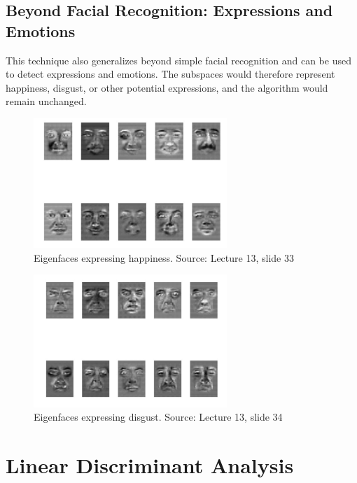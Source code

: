 \documentclass{article}
\begin{document}
\subsection{Beyond Facial Recognition: Expressions and Emotions}
This technique also generalizes beyond simple facial recognition and can be used to detect expressions and emotions. The subspaces would therefore represent happiness, disgust, or other potential expressions, and the algorithm would remain unchanged. 

\begin{figure}[H]
  \centering
  \includegraphics[width=0.65\textwidth]{happy}
  \caption{Eigenfaces expressing happiness. Source: Lecture 13, slide 33}
\end{figure}

\begin{figure}[H]
  \centering
  \includegraphics[width=0.65\textwidth]{disgust}
  \caption{Eigenfaces expressing disgust. Source: Lecture 13, slide 34}
\end{figure}


\section{Linear Discriminant Analysis}
\end{document}
